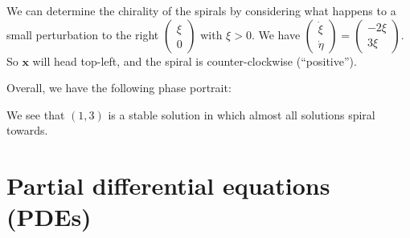 \documentclass[a4paper]{article}
\begin{document}
\begin{eg}
      We can determine the chirality of the spirals by considering what happens to a small perturbation to the right $
      \begin{pmatrix}
        \xi\\0
      \end{pmatrix}$ with $\xi > 0$. We have $
      \begin{pmatrix}
        \dot\xi\\\dot\eta
      \end{pmatrix} = 
      \begin{pmatrix}
        -2\xi\\3\xi
      \end{pmatrix}$. So $\mathbf{x}$ will head top-left, and the spiral is counter-clockwise (``positive'').






      Overall, we have the following phase portrait:

      We see that $(1, 3)$ is a stable solution in which almost all solutions spiral towards. 
    \end{eg}

    \section{Partial differential equations (PDEs)}
\end{document}
